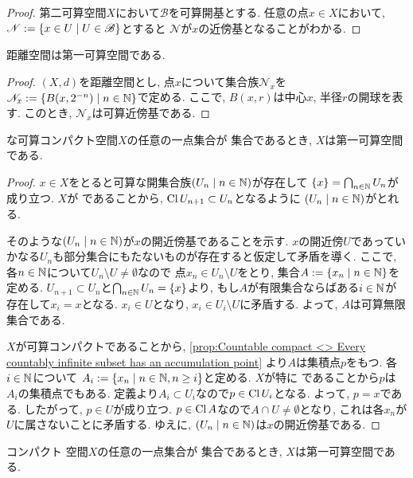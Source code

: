 \documentclass[uplatex, dvipdfmx, a4paper, 12pt, class=jsbook, crop=false]{standalone}
\begin{document}
\begin{proof}
	第二可算空間$ X $において$ \mathscr{B} $を可算開基とする.
	任意の点$ x \in X $において, $ \mathscr{N} \defeq \setcomp{x \in U}{U \in \mathscr{B}} $とすると
	$ \mathscr{N} $が$ x $の近傍基となることがわかる.
\end{proof}

\begin{proposition}
	距離空間は第一可算空間である.
\end{proposition}

\begin{proof}
	$ (X, d) $を距離空間とし, 点$ x $について集合族$ \mathscr{N}_x $を
	$ \mathscr{N}_x \defeq \setcomp{B(x,2^{-n})}{n \in \N} $で定める.
	ここで, $ B(x,r) $は中心$ x $, 半径$ r $の開球を表す.
	このとき, $ \mathscr{N}_x $は可算近傍基である.
\end{proof}

\begin{proposition}
	 な可算コンパクト空間$ X $の任意の一点集合が \Gdelta 集合であるとき,
	$ X $は第一可算空間である.
\end{proposition}

\begin{proof}
	$ x \in X $をとると可算な開集合族$ \setfamily{U_n}{n \in \N} $が存在して
	$ \lrbrace{x} = \bigcap_{n \in \N} U_n $が成り立つ.
	$ X $が  であることから, $ \mathop{\mathrm{Cl}}\nolimits U_{n+1} \subset U_n $となるように
	$ \setfamily{U_n}{n \in \N} $がとれる.

	そのような$ \setfamily{U_n}{n \in \N} $が$ x $の開近傍基であることを示す.
	$ x $の開近傍$ U $であっていかなる$ U_n $も部分集合にもたないものが存在すると仮定して矛盾を導く.
	ここで, 各$ n \in \mathbb{N} $について$ U_n \setminus U \neq \emptyset $なので
	点$ x_n \in U_n \setminus U $をとり, 集合$ A \defeq \setcomp{x_n}{n \in \N} $を定める.
	$ U_{n+1} \subset U_n $と$ \bigcap_{n \in \N} U_n = \lrbrace{x} $より,
	もし$ A $が有限集合ならばある$ i \in \mathbb{N} $が存在して$ x_i = x $となる.
	$ x_i \in U $となり, $ x_i \in U_i \setminus U $に矛盾する.
	よって, $ A $は可算無限集合である.

	$ X $が可算コンパクトであることから, \cref{prop:Countable compact <> Every countably infinite subset has an accumulation point}
	より$ A $は集積点$ p $をもつ. 各$ i \in \mathbb{N} $について
	$ A_i \defeq \setcomp{x_n}{n \in \N, n \geq i} $と定める.
	$ X $が特に  であることから$ p $は$ A_i $の集積点でもある.
	定義より$ A_i \subset U_i $なので$ p \in \mathop{\mathrm{Cl}}\nolimits U_i $となる.
	よって, $ p = x $である.
	したがって, $ p \in U $が成り立つ.
	$ p \in \mathop{\mathrm{Cl}}\nolimits A $なので$ A \cap U \neq \emptyset $となり,
	これは各$ x_n $が$ U $に属さないことに矛盾する.
	ゆえに, $ \setfamily{U_n}{n \in \N} $は$ x $の開近傍基である.
\end{proof}

\begin{corollary}
	コンパクト \Hausdorff 空間$ X $の任意の一点集合が \Gdelta 集合であるとき,
	$ X $は第一可算空間である.
\end{corollary}
\end{document}
